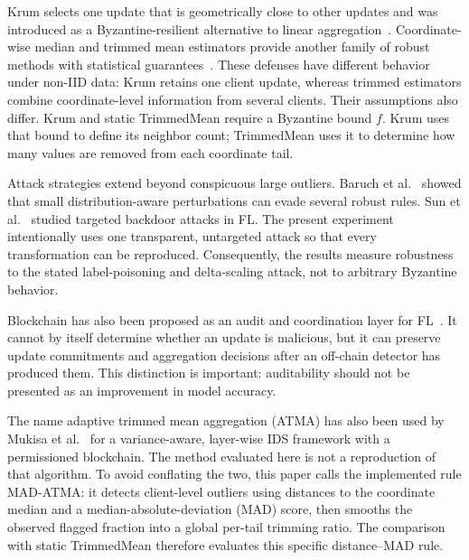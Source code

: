 \documentclass[10pt,letterpaper]{article}
\begin{document}
Krum selects one update that is geometrically close to other updates and was
introduced as a Byzantine-resilient alternative to linear
aggregation~\cite{blanchard2017}. Coordinate-wise median and trimmed mean
estimators provide another family of robust methods with statistical
guarantees~\cite{yin2018}. These defenses have different behavior under non-IID
data: Krum retains one client update, whereas trimmed estimators combine
coordinate-level information from several clients. Their assumptions also
differ. Krum and static TrimmedMean require a Byzantine bound $f$. Krum uses
that bound to define its neighbor count; TrimmedMean uses it to determine how
many values are removed from each coordinate tail.

Attack strategies extend beyond conspicuous large outliers. Baruch et
al.~\cite{baruch2019} showed that small distribution-aware perturbations can
evade several robust rules. Sun et al.~\cite{sun2019} studied targeted backdoor
attacks in FL. The present experiment intentionally uses one transparent,
untargeted attack so that every transformation can be reproduced. Consequently,
the results measure robustness to the stated label-poisoning and delta-scaling
attack, not to arbitrary Byzantine behavior.

Blockchain has also been proposed as an audit and coordination layer for
FL~\cite{kim2020,lu2020}. It cannot by itself determine whether an update is
malicious, but it can preserve update commitments and aggregation decisions
after an off-chain detector has produced them. This distinction is important:
auditability should not be presented as an improvement in model accuracy.

The name adaptive trimmed mean aggregation (ATMA) has also been used by Mukisa
et al.~\cite{mukisa2025} for a variance-aware, layer-wise IDS framework with a
permissioned blockchain. The method evaluated here is not a reproduction of
that algorithm. To avoid conflating the two, this paper calls the implemented
rule MAD-ATMA: it detects client-level outliers using distances to the
coordinate median and a median-absolute-deviation (MAD) score, then smooths the
observed flagged fraction into a global per-tail trimming ratio. The comparison
with static TrimmedMean therefore evaluates this specific distance--MAD rule.
\end{document}
